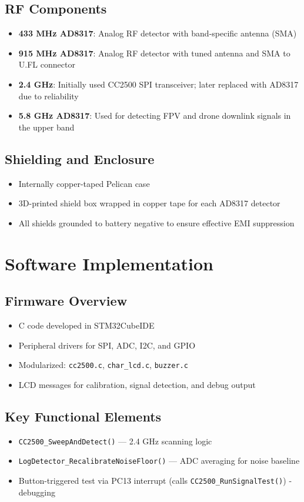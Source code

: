 \documentclass[12pt]{article}
\begin{document}
\subsection{RF Components}
\begin{itemize}
    \item \textbf{433 MHz AD8317}: Analog RF detector with band-specific antenna (SMA)
    \item \textbf{915 MHz AD8317}: Analog RF detector with tuned antenna and SMA to U.FL connector
    \item \textbf{2.4 GHz}: Initially used CC2500 SPI transceiver; later replaced with AD8317 due to reliability
    \item \textbf{5.8 GHz AD8317}: Used for detecting FPV and drone downlink signals in the upper band
\end{itemize}

\subsection{Shielding and Enclosure}
\begin{itemize}
    \item Internally copper-taped Pelican case
    \item 3D-printed shield box wrapped in copper tape for each AD8317 detector
    \item All shields grounded to battery negative to ensure effective EMI suppression
\end{itemize}

\section{Software Implementation}

\subsection{Firmware Overview}
\begin{itemize}
    \item C code developed in STM32CubeIDE
    \item Peripheral drivers for SPI, ADC, I2C, and GPIO
    \item Modularized: \texttt{cc2500.c}, \texttt{char\_lcd.c}, \texttt{buzzer.c}
    \item LCD messages for calibration, signal detection, and debug output
\end{itemize}

\subsection{Key Functional Elements}
\begin{itemize}
    \item \texttt{CC2500\_SweepAndDetect()} — 2.4 GHz scanning logic
    \item \texttt{LogDetector\_RecalibrateNoiseFloor()} — ADC averaging for noise baseline
    \item Button-triggered test via PC13 interrupt (calls \texttt{CC2500\_RunSignalTest()}) -debugging
\end{itemize}
\end{document}
